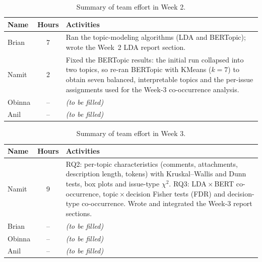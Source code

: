 \documentclass[11pt,a4paper]{report}
\begin{document}
\begin{table}[H]
  \centering
  \caption{Summary of team effort in Week 2.}
  \label{tab:w2}
  \begin{tabular}{p{3cm} c p{9cm}}
    \toprule
    \textbf{Name} & \textbf{Hours} & \textbf{Activities} \\
    \midrule
    Brian & 7 & Ran the topic-modeling algorithms (LDA and BERTopic); wrote the
                Week~2 LDA report section. \\
    Namit & 2 & Fixed the BERTopic results: the initial run collapsed into two
                topics, so re-ran BERTopic with KMeans ($k=7$) to obtain seven
                balanced, interpretable topics and the per-issue assignments used
                for the Week-3 co-occurrence analysis. \\
    Obinna & -- & \textit{(to be filled)} \\
    Anil   & -- & \textit{(to be filled)} \\
    \bottomrule
  \end{tabular}
\end{table}

\begin{table}[H]
  \centering
  \caption{Summary of team effort in Week 3.}
  \label{tab:w3}
  \begin{tabular}{p{3cm} c p{9cm}}
    \toprule
    \textbf{Name} & \textbf{Hours} & \textbf{Activities} \\
    \midrule
    Namit  & 9 & RQ2: per-topic characteristics (comments, attachments,
                 description length, tokens) with Kruskal--Wallis and Dunn tests,
                 box plots and issue-type $\chi^2$. RQ3: LDA\,$\times$\,BERT
                 co-occurrence, topic\,$\times$\,decision Fisher tests (FDR) and
                 decision-type co-occurrence. Wrote and integrated the Week-3
                 report sections. \\
    Brian  & -- & \textit{(to be filled)} \\
    Obinna & -- & \textit{(to be filled)} \\
    Anil   & -- & \textit{(to be filled)} \\
    \bottomrule
  \end{tabular}
\end{table}
\end{document}
